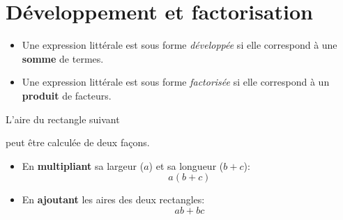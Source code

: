 \documentclass{poly}
\begin{document}
\newpage
\section{Développement et factorisation}
\begin{definition}
\begin{itemize}
\item Une expression littérale est sous forme \emph{développée} si elle correspond à une \textbf{somme} de termes.
\item Une expression littérale est sous forme \emph{factorisée} si elle correspond à un \textbf{produit} de facteurs.
\end{itemize}
\end{definition}
\begin{example}
L'aire du rectangle suivant
\begin{center}
\end{center}
peut être calculée de deux façons.
\begin{itemize}
\item En \textbf{multipliant} sa largeur ($a$) et sa longueur ($b + c$):
\begin{equation*}
a(b + c)    
\end{equation*}
\item En \textbf{ajoutant} les aires des deux rectangles:
\begin{equation*}
ab + bc
\end{equation*}  
\end{itemize}
\end{example}
\end{document}
